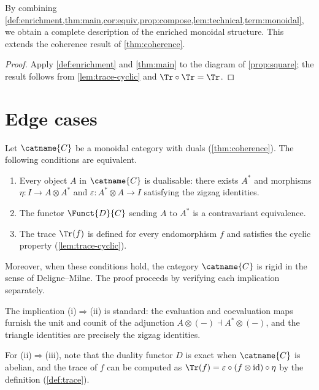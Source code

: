 \documentclass{article}
\numberwithin{equation}{section}
\begin{document}
\begin{theorem}\label{thm:omnibus}
By combining
\cref{def:enrichment,thm:main,cor:equiv,prop:compose,lem:technical,term:monoidal},
we obtain a complete description of the enriched monoidal structure.
This extends the coherence result of \cref{thm:coherence}.
\end{theorem}

\begin{proof}
Apply \cref{def:enrichment} and \cref{thm:main} to the diagram
of \cref{prop:square}; the result follows from \cref{lem:trace-cyclic}
and $\Tr \circ \Tr = \Tr$.
\end{proof}


\section{Edge cases}
\label{sec:edge}

\begin{theorem}\label{thm:long}
Let $\catname{C}$ be a monoidal category with duals
(\cref{thm:coherence}).  The following
conditions are equivalent.

\begin{enumerate}[label=(\roman*)]
  \item Every object $A$ in $\catname{C}$ is dualisable: there exists
    $A^*$ and morphisms $\eta\colon I \to A \otimes A^*$ and
    $\varepsilon\colon A^* \otimes A \to I$ satisfying the zigzag
    identities.
  \item The functor $\Funct{D}{C}$ sending $A$ to $A^*$ is a
    contravariant equivalence.
  \item The trace $\Tr(f)$ is defined for every endomorphism $f$
    and satisfies the cyclic property (\cref{lem:trace-cyclic}).
\end{enumerate}

Moreover, when these conditions hold, the category $\catname{C}$ is
rigid in the sense of Deligne--Milne.  The proof proceeds by verifying
each implication separately.

The implication (i)$\Rightarrow$(ii) is standard: the evaluation and
coevaluation maps furnish the unit and counit of the adjunction
$A \otimes (-) \dashv A^* \otimes (-)$, and the triangle identities
are precisely the zigzag identities.

For (ii)$\Rightarrow$(iii), note that the duality functor $D$ is
exact when $\catname{C}$ is abelian, and the trace of $f$ can be
computed as $\Tr(f) = \varepsilon \circ (f \otimes \mathrm{id}) \circ \eta$
by the definition (\cref{def:trace}).
\end{theorem}
\end{document}
